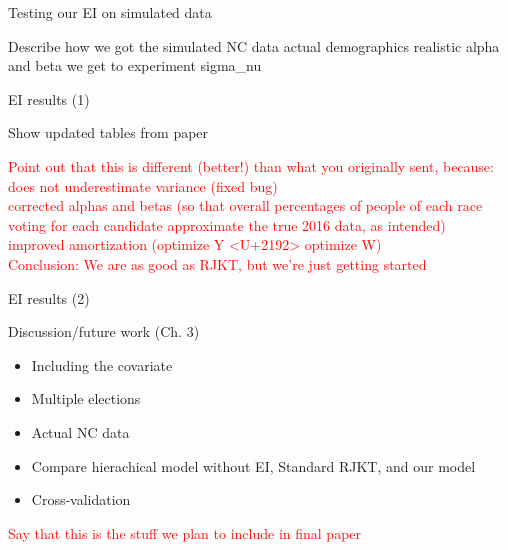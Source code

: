 \documentclass[
  ignorenonframetext,
]{beamer}
\providecommand{\tightlist}{%
  \setlength{\itemsep}{0pt}\setlength{\parskip}{0pt}}
\begin{document}
\begin{frame}{Testing our EI on simulated data}
\protect\hypertarget{testing-our-ei-on-simulated-data}{}

Describe how we got the simulated NC data actual demographics realistic
alpha and beta we get to experiment sigma\_nu

\end{frame}

\begin{frame}{EI results (1)}
\protect\hypertarget{ei-results-1}{}

Show updated tables from paper

\textcolor{red}{{\scriptsize Point out that this is different (better!) than what you originally sent, because:\\does not underestimate variance (fixed bug)\\corrected alphas and betas (so that overall percentages of people of each race voting for each candidate approximate the true 2016 data, as intended)\\improved amortization (optimize Y <U+2192> optimize W)\\Conclusion: We are as good as RJKT, but we’re just getting started}}

\end{frame}

\begin{frame}{EI results (2)}
\protect\hypertarget{ei-results-2}{}

\end{frame}

\begin{frame}{Discussion/future work (Ch. 3)}
\protect\hypertarget{discussionfuture-work-ch.-3}{}

\begin{itemize}
\tightlist
\item
  Including the covariate
\item
  Multiple elections
\item
  Actual NC data
\item
  Compare hierachical model without EI, Standard RJKT, and our model
\item
  Cross-validation
\end{itemize}

\textcolor{red}{{\scriptsize Say that this is the stuff we plan to include in final paper}}

\end{frame}
\end{document}
